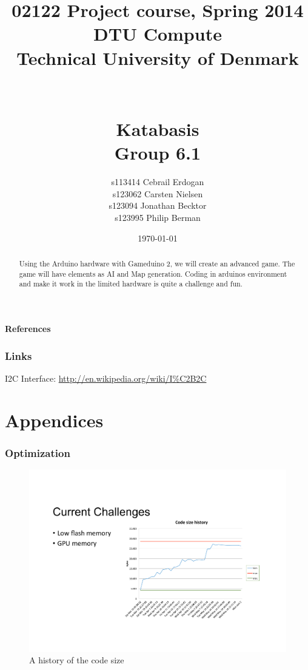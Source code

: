 \documentclass[12pt]{report}
\title{02122 Project course, Spring 2014 \\
DTU Compute \\
Technical University of Denmark \\~\\~\\ Katabasis \\ Group 6.1}
\author{s113414 Cebrail Erdogan \\
        s123062 Carsten Nielsen \\
        s123094 Jonathan Becktor\\
        s123995 Philip Berman   \\  }
\date{\today}
\begin{document}
\maketitle

\begin{abstract}
Using the Arduino hardware with Gameduino 2, we will create an advanced game.
The game will have elements as AI and Map generation.
Coding in arduinos environment and make it work in the
limited hardware is quite a challenge and fun.
\end{abstract}


\tableofcontents

\newpage



\newpage





















\newpage

\textbf{References}

\subsection{Links}


I2C Interface: \url{http://en.wikipedia.org/wiki/I%C2B2C}

\newpage
\chapter{Appendices}

\subsection{Optimization}

\begin{figure}[h]
  \centering
  \includegraphics[scale=0.8]{Figures/CodeSizeChart}
  \caption{A history of the code size}
  \label{fig:code_size}
\end{figure}
\end{document}
